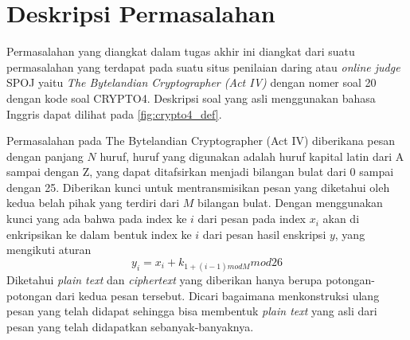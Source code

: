	\section{Deskripsi Permasalahan}
	\label{chapter:dasar-teori}
	Permasalahan yang diangkat dalam tugas akhir ini diangkat dari suatu permasalahan yang terdapat pada suatu situs penilaian daring atau \textit{online judge} SPOJ yaitu \textit{The Bytelandian Cryptographer (Act IV)} dengan nomer soal 20 dengan kode soal CRYPTO4. Deskripsi soal yang asli menggunakan bahasa Inggris dapat dilihat pada \ref{fig:crypto4_def}\cite{piwakowski_crypto4_2004}.
	
	
	 Permasalahan pada The Bytelandian Cryptographer (Act IV) diberikana pesan dengan panjang $N$ huruf, huruf yang digunakan adalah huruf kapital latin dari A sampai dengan Z, yang dapat ditafsirkan menjadi bilangan bulat dari 0 sampai dengan 25. Diberikan kunci untuk mentransmisikan pesan yang diketahui oleh kedua belah pihak yang terdiri dari $M$ bilangan bulat. Dengan menggunakan kunci yang ada bahwa pada index ke $i$ dari pesan pada index $x_i$ akan di enkripsikan ke dalam bentuk index ke $i$ dari pesan hasil enskripsi $y$, yang mengikuti aturan
	\begin{equation}
	y_i=x_i+k_{1+(i-1)mod M} mod 26 
	\end{equation}		 
	 Diketahui \textit{plain text} dan \textit{ciphertext} yang diberikan hanya berupa potongan-potongan dari kedua pesan tersebut. Dicari bagaimana menkonstruksi ulang pesan yang telah didapat sehingga bisa membentuk \textit{plain text} yang asli dari pesan yang telah didapatkan sebanyak-banyaknya.
